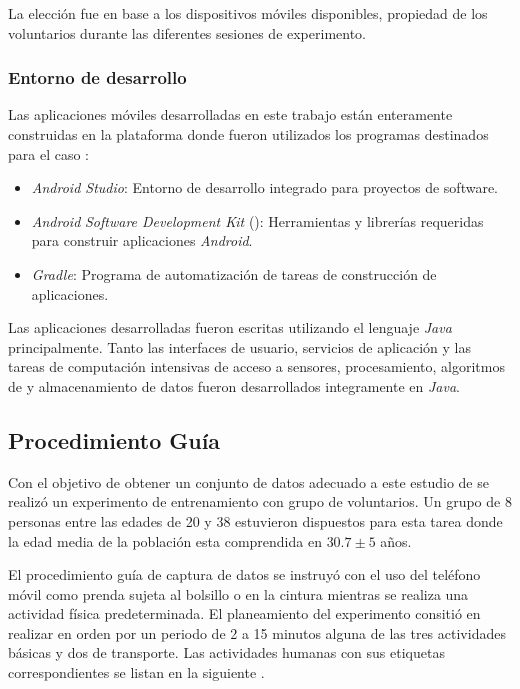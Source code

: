 La elección fue en base a los dispositivos móviles disponibles, propiedad
de los voluntarios durante las diferentes sesiones de experimento.

\subsubsection{Entorno de desarrollo }

Las aplicaciones móviles desarrolladas en este trabajo están enteramente
construidas en la plataforma \emph{} donde fueron utilizados
los programas destinados para el caso \cite{Android2016}:
\begin{itemize}
\item \emph{Android Studio}: Entorno de desarrollo integrado para proyectos\emph{
}de software.
\item \emph{Android} \emph{Software Development Kit }(): Herramientas
y librerías  requeridas para construir aplicaciones \emph{Android}.
\item \emph{Gradle}: Programa de automatización de tareas de construcción
de aplicaciones.
\end{itemize}
Las aplicaciones desarrolladas fueron escritas utilizando el lenguaje
\emph{Java }principalmente. Tanto las interfaces de usuario, servicios
de aplicación y las tareas de computación intensivas de acceso a sensores,
procesamiento, algoritmos de  y almacenamiento de datos
fueron desarrollados integramente en \emph{Java}.

\subsection{Procedimiento Guía }

Con el objetivo de obtener un conjunto de datos adecuado a este estudio
de  se realizó un experimento de entrenamiento con grupo
de voluntarios. Un grupo de 8 personas entre las edades de 20 y 38
estuvieron dispuestos para esta tarea donde la edad media de la población
esta comprendida en $30.7\pm5$ años. 

El procedimiento guía de captura de datos se instruyó con el uso del
teléfono móvil como prenda sujeta al bolsillo o en la cintura mientras
se realiza una actividad física predeterminada. El planeamiento del
experimento consitió en realizar en orden por un periodo de 2 a 15
minutos alguna de las tres actividades básicas y dos de transporte.
Las actividades humanas con sus etiquetas correspondientes se listan
en la siguiente .

